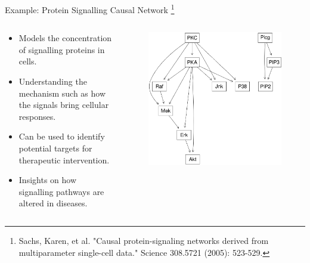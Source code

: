 \documentclass{beamer}
\begin{document}
\begin{frame}{Example: Protein Signalling Causal Network \footnote{Sachs, Karen, et al. "Causal protein-signaling networks derived from multiparameter single-cell data." Science 308.5721 (2005): 523-529.}}
	\begin{columns}
		\begin{column}{0.5\textwidth}
			\begin{itemize}
				\item Models the concentration of signalling proteins in cells.
				\item Understanding the mechanism such as how the signals bring cellular responses.
				\item Can be used to identify potential targets for therapeutic intervention.
				\item Insights on how signalling pathways are altered in diseases.
			\end{itemize}
		\end{column}
		\begin{column}{0.5\textwidth}
			\begin{figure}
				\centering
				\includegraphics[scale=0.22]{imgs/sachs.png}
			\end{figure}
		\end{column}
	\end{columns}
\end{frame}
\end{document}
